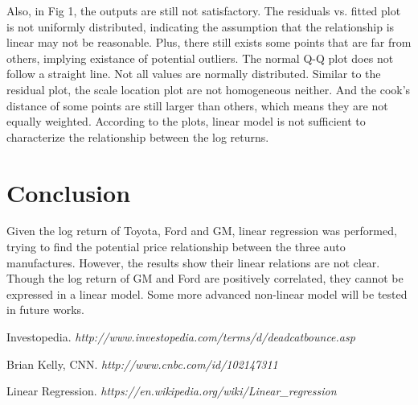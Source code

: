 \documentclass[11pt, conference]{IEEEtran}
\begin{document}
Also, in Fig 1, the outputs are still not satisfactory. The residuals vs. fitted plot is not uniformly distributed, indicating the assumption that the relationship is linear may not be reasonable. Plus, there still exists some points that are far from others, implying existance of potential outliers. The normal Q-Q plot does not follow a straight line. Not all values are normally distributed. Similar to the residual plot, the scale location plot are not homogeneous neither. And the cook's distance of some points are still larger than others, which means they are not equally weighted. According to the plots, linear model is not sufficient to characterize the relationship between the log returns. 


\section{Conclusion}
Given the log return of Toyota, Ford and GM, linear regression was performed, trying to find the potential price relationship between the three auto manufactures. However, the results show their linear relations are not clear. Though the log return of GM and Ford are positively correlated, they cannot be expressed in a linear model. Some more advanced non-linear model will be tested in future works.  










%
%
%
\begin{thebibliography}{3}

Investopedia.  \emph{http://www.investopedia.com/terms/d/deadcatbounce.asp}

Brian Kelly, CNN.  \emph{http://www.cnbc.com/id/102147311}

Linear Regression.  \emph{https://en.wikipedia.org/wiki/Linear\_regression}

\end{thebibliography}
\end{document}
